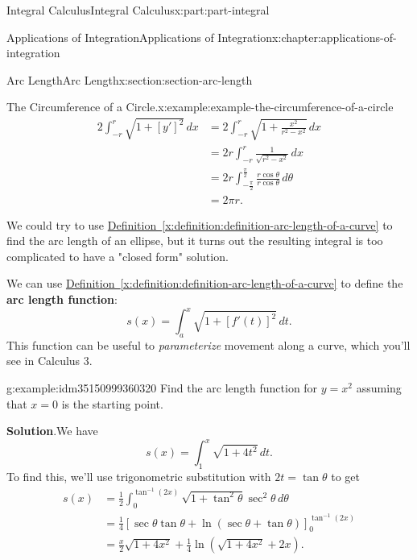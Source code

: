 \documentclass[twoside,10pt,]{tufte-book}
\newcommand{\blocktitlefont}{\relax}
\newcommand{\xreffont}{\relax}
\newcommand{\terminology}[1]{\textbf{#1}}
\numberwithin{equation}{part}
\newcommand{\amp}{&}
\begin{document}
\begin{partptx}{Integral Calculus}{}{Integral Calculus}{}{}{x:part:part-integral}
\begin{chapterptx}{Applications of Integration}{}{Applications of Integration}{}{}{x:chapter:applications-of-integration}
\begin{sectionptx}{Arc Length}{}{Arc Length}{}{}{x:section:section-arc-length}
\begin{example}{The Circumference of a Circle.}{x:example:example-the-circumference-of-a-circle}
\begin{align*}
2\int_{-r}^{r}\sqrt{1 + [y']^{2}}\,dx \amp = 2\int_{-r}^{r}\sqrt{1 + \frac{x^{2}}{r^{2} - x^{2}}}\,dx \\
\amp = 2r\int_{-r}^{r}\frac{1}{\sqrt{r^{2} - x^{2}}}\,dx \\
\amp = 2r\int_{-\frac{\pi}{2}}^{\frac{\pi}{2}}\frac{r\cos\theta}{r\cos\theta}\,d\theta \\
\amp = 2\pi r. 
\end{align*}
%
\end{example}
We could try to use \hyperref[x:definition:definition-arc-length-of-a-curve]{Definition~{\xreffont\ref{x:definition:definition-arc-length-of-a-curve}}} to find the arc length of an ellipse, but it turns out the resulting integral is too complicated to have a "closed form" solution.%
\par
We can use \hyperref[x:definition:definition-arc-length-of-a-curve]{Definition~{\xreffont\ref{x:definition:definition-arc-length-of-a-curve}}} to define the \terminology{arc length function}:%
\begin{equation*}
s(x) = \int_{a}^{x}\sqrt{1 + [f'(t)]^{2}}\,dt.
\end{equation*}
This function can be useful to \emph{parameterize} movement along a curve, which you'll see in Calculus 3.%
\begin{example}{}{g:example:idm35150999360320}%
Find the arc length function for \(y = x^{2}\) assuming that \(x = 0\) is the starting point.%
\par\smallskip%
\noindent\textbf{\blocktitlefont Solution}.\hypertarget{g:solution:idm35150999359040}{}\quad{}We have%
\begin{equation*}
s(x) = \int_{1}^{x}\sqrt{1 + 4t^{2}}\,dt.
\end{equation*}
To find this, we'll use trigonometric substitution with \(2t = \tan\theta\) to get%
\begin{align*}
s(x) \amp = \frac{1}{2}\int_{0}^{\tan^{-1}(2x)}\sqrt{1 + \tan^{2}\theta}\sec^{2}\theta\,d\theta \\
\amp = \frac{1}{4}\left[\sec\theta\tan\theta + \ln(\sec\theta + \tan\theta)\right]_{0}^{\tan^{-1}(2x)} \\
\amp = \frac{x}{2}\sqrt{1 + 4x^{2}} + \frac{1}{4}\ln(\sqrt{1 + 4x^{2}} + 2x). 
\end{align*}
%
\end{example}
\end{sectionptx}
%
%
\typeout{************************************************}

\end{chapterptx}
\end{partptx}
\end{document}
